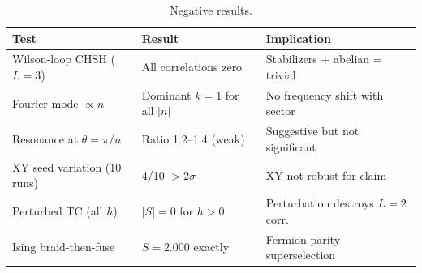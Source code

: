 \documentclass[aps,pra,twocolumn,superscriptaddress,showpacs,floatfix]{revtex4-2}
\begin{document}
\begin{table}[h]
\caption{Negative results.}
\label{tab:negative}
\begin{ruledtabular}
\begin{tabular}{lll}
Test & Result & Implication \\
\midrule
Wilson-loop CHSH ($L{=}3$)     & All correlations zero    & Stabilizers + abelian = trivial \\
Fourier mode $\propto n$       & Dominant $k{=}1$ for all $|n|$ & No frequency shift with sector \\
Resonance at $\theta{=}\pi/n$  & Ratio 1.2--1.4 (weak)    & Suggestive but not significant \\
XY seed variation (10 runs)    & 4/10 ${>}2\sigma$       & XY not robust for claim \\
Perturbed TC (all $h$)         & $|S|{=}0$ for $h{>}0$   & Perturbation destroys $L{=}2$ corr. \\
Ising braid-then-fuse          & $S{=}2.000$ exactly      & Fermion parity superselection \\
\end{tabular}
\end{ruledtabular}
\end{table}
\end{document}
